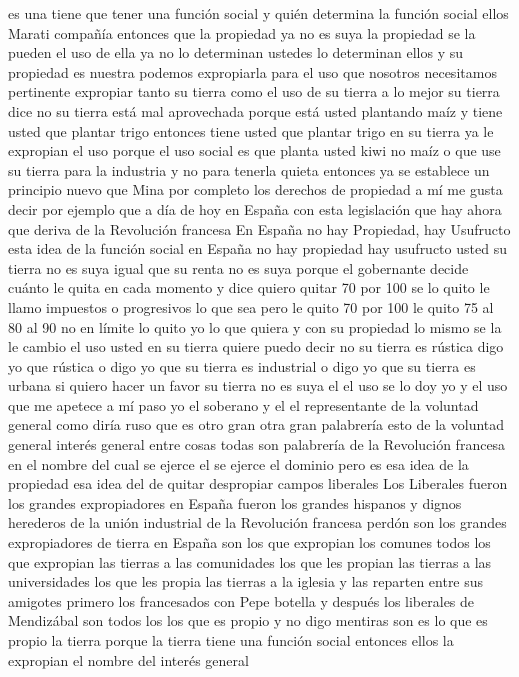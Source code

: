 es una tiene que tener una función social y quién determina la función social ellos Marati compañía
entonces que la propiedad ya no es suya la propiedad se la pueden el uso de ella ya no lo determinan ustedes
lo determinan ellos y su propiedad es nuestra podemos expropiarla para el uso que nosotros necesitamos pertinente
expropiar tanto su tierra como el uso de su tierra a lo mejor su tierra dice no su tierra está mal aprovechada porque está usted plantando maíz
y tiene usted que plantar trigo entonces tiene usted que plantar trigo en su tierra ya le expropian el uso porque el uso social es que planta usted kiwi no maíz
o que use su tierra para la industria y no para tenerla quieta entonces ya se establece un principio nuevo que Mina por completo los derechos de propiedad
a mí me gusta decir por ejemplo que a día de hoy en España con esta legislación que hay ahora que deriva de la Revolución francesa
En España no hay Propiedad, hay Usufructo
esta idea de la función social en España no hay propiedad hay usufructo usted su tierra no es suya
igual que su renta no es suya porque el gobernante decide cuánto le quita en cada momento y dice quiero quitar 70 por 100
se lo quito le llamo impuestos o progresivos lo que sea pero le quito 70 por 100 le quito 75 al 80 al 90 no en límite lo quito yo lo que quiera
y con su propiedad lo mismo se la le cambio el uso usted en su tierra quiere puedo decir no
su tierra es rústica digo yo que rústica o digo yo que su tierra es industrial o digo yo que su tierra es urbana
si quiero hacer un favor su tierra no es suya el el uso se lo doy yo y el uso que me apetece a mí paso yo el soberano y el
el representante de la voluntad general como diría ruso que es otro gran otra gran palabrería esto de la voluntad general
interés general entre cosas todas son palabrería de la Revolución francesa en el nombre del cual se ejerce el
se ejerce el dominio pero es esa idea de la propiedad esa idea del de quitar despropiar campos liberales
Los Liberales fueron los grandes expropiadores en España
fueron los grandes hispanos y dignos herederos de la unión industrial de la Revolución francesa perdón son los grandes expropiadores de tierra
en España son los que expropian los comunes todos los que expropian las tierras a las comunidades los que les propian las tierras a las universidades
los que les propia las tierras a la iglesia y las reparten entre sus amigotes primero los francesados
con Pepe botella y después los liberales de Mendizábal son todos los los que es propio y no digo mentiras
son es lo que es propio la tierra porque la tierra tiene una función social entonces ellos la expropian el nombre del interés general
